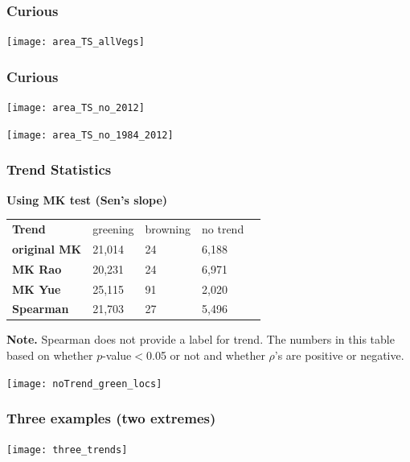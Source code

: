 \documentclass[serif, xcolor={dvipsnames}]{beamer} %
\begin{document}
\begin{frame}
 \frametitle{Curious}
\texttt{[image: area\_TS\_allVegs]}~%
\end{frame}
\begin{frame}
 \frametitle{Curious}
{\hspace*{-5mm}}
\begin{minipage}{.5\textwidth}
\texttt{[image: area\_TS\_no\_2012]}~%
\end{minipage}%
\hspace{.21cm}
\begin{minipage}{.5\textwidth}
\texttt{[image: area\_TS\_no\_1984\_2012]}~%
\end{minipage}
\end{frame}
\fi
\begin{frame}
\frametitle{Trend Statistics}

{\bf Using MK test (Sen's slope)}

\begin{table}[!ht]
\centering
\captionsetup{singlelinecheck=false, format=hang}
\label{tab:Trendcounts}
\begin{tabular}{lllll}
\bottomrule
\rowcolor{shadecolor} \textbf{Trend} & 
 greening & browning & no trend \\ 
\textbf{original MK}  & 21,014 & 24 & 6,188 \\
\rowcolor{shadecolor} \textbf{MK Rao}  & 20,231 & 24 & 6,971 \\
\textbf{MK Yue}  &  25,115 & 91 & 2,020 \\
\rowcolor{aliceblue}\textbf{Spearman}  & 21,703 & 27 & 5,496\\
\toprule
\end{tabular}
\end{table}
\begin{tcolorbox}
{\scriptsize{\bf Note.} Spearman does not provide a label for trend. The numbers
in this table based on whether $p$-value$<$0.05 or not and whether $\rho$'s are positive or negative.}
\end{tcolorbox}
\end{frame}
\begin{frame}
\begin{center}
\texttt{[image: noTrend\_green\_locs]}
\end{center}
\end{frame}
\begin{frame}
 \frametitle{Three examples (two extremes)}
\begin{center}
\texttt{[image: three\_trends]}
\end{center}
\end{frame}
\end{document}
